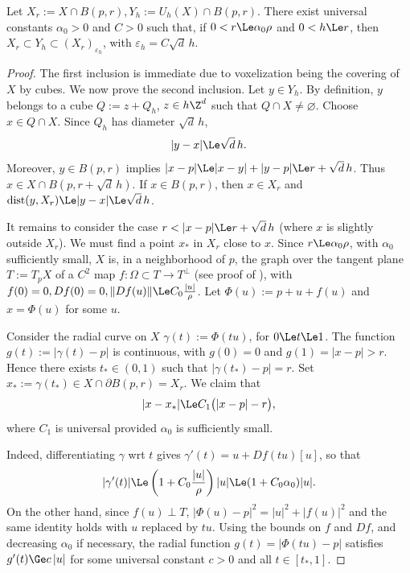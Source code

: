 \begin{theorem}
\label{thm:cubical-admissible-set}
Let $X_r:=X\cap B(p,r), Y_h:=U_h(X)\cap B(p,r)$. There exist universal
constants $\alpha_0>0$ and $C>0$ such that, if $0<r \Le \alpha_0\rho$
and $0<h \Le r$, then $X_r \subset Y_h \subset (X_r)_{\varepsilon_h}$,
with $\varepsilon_h=C\sqrt d\,h$. 
\end{theorem}
\begin{proof}
The first inclusion is immediate due to voxelization being the
covering of $X$ by cubes.  We now prove the second inclusion.  Let
$y\in Y_h$. By definition, $y$ belongs to a cube $Q := z + Q_h$, $z
\in h\Z^d$ such that $Q\cap X\neq\varnothing$.  Choose $x\in Q\cap
X$. Since $Q_h$ has diameter $\sqrt d\,h$,
\begin{equation}
\label{eq:y-x-cube}
    |y-x|\Le \sqrt d\,h.
\end{equation}
Moreover, $y\in B(p,r)$ implies $|x-p| \Le |x-y|+|y-p| \Le r+\sqrt
d\,h$.  Thus $x\in X\cap B(p,r+\sqrt d\,h)$.  If $x\in B(p,r)$, then
$x\in X_r$ and $\operatorname{dist}(y,X_r) \Le |y-x| \Le \sqrt
d\,h$.

It remains to consider the case $r<|x-p|\Le r+\sqrt d\,h$ (where $x$
is slightly outside $X_r$). We must find a point $x_*$ in $X_r$ close to
$x$. Since $r\Le\alpha_0\rho$, with $\alpha_0$ sufficiently small, $X$ is,
in a neighborhood of $p$, the graph over the tangent plane $T:=T_pX$
of a $C^2$ map $f:\Omega\subset T \to T^\perp$ (see proof of
), with $f(0)=0, Df(0)=0,
\|Df(u)\| \Le C_0\frac{|u|}{\rho}$. Let $\Phi(u):=p+u+f(u)$ and
$x=\Phi(u)$ for some $u$.

Consider the radial curve on $X$ $\gamma(t):=\Phi(tu)$, for $0\Le
t\Le 1$.  The function $g(t):=|\gamma(t)-p|$ is continuous, with
$g(0)=0$ and $g(1)=|x-p|>r$.  Hence there exists $t_*\in(0,1)$ such
that $|\gamma(t_*)-p|=r$.  Set $x_*:=\gamma(t_*)\in X\cap\partial
B(p,r) = X_r$.  We claim that
\begin{equation}
\label{eq:x-xstar}
    |x-x_*| \Le C_1\bigl(|x-p|-r\bigr),
\end{equation}
where $C_1$ is universal provided $\alpha_0$ is sufficiently small.

Indeed, differentiating $\gamma$ wrt $t$ gives $\gamma'(t) = u+Df(tu)[u]$,
so that
\[
    |\gamma'(t)| \Le \left(1+C_0\frac{|u|}{\rho}\right)|u| \Le
    (1+C_0\alpha_0)|u|.
\]
On the other hand, since $f(u)\perp T$, $|\Phi(u)-p|^2 =
|u|^2+|f(u)|^2$ and the same identity holds with $u$ replaced by $tu$.
Using the bounds on $f$ and $Df$, and decreasing $\alpha_0$ if
necessary, the radial function $g(t)=|\Phi(tu)-p|$ satisfies
$g'(t)\Ge c\,|u|$ for some universal constant $c>0$ and all
$t\in[t_*,1]$.


\end{proof}
